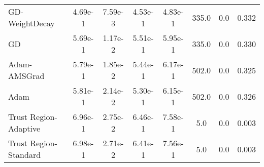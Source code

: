 \documentclass{article}
\begin{document}
\begin{table}[htbp]
{\begin{tabular}{l*{7}{S[table-format=2.2e-1]}}
GD-WeightDecay & 4.69e-1 & 7.59e-3 & 4.53e-1 & 4.83e-1 & 335.0 & 0.0 & 0.332 \\
GD & 5.69e-1 & 1.17e-2 & 5.51e-1 & 5.95e-1 & 335.0 & 0.0 & 0.330 \\
Adam-AMSGrad & 5.79e-1 & 1.85e-2 & 5.44e-1 & 6.17e-1 & 502.0 & 0.0 & 0.325 \\
Adam & 5.81e-1 & 2.14e-2 & 5.30e-1 & 6.15e-1 & 502.0 & 0.0 & 0.326 \\
Trust Region-Adaptive & 6.96e-1 & 2.75e-2 & 6.46e-1 & 7.58e-1 & 5.0 & 0.0 & 0.003 \\
Trust Region-Standard & 6.98e-1 & 2.71e-2 & 6.41e-1 & 7.56e-1 & 5.0 & 0.0 & 0.003 \\
\bottomrule
\end{tabular}
}
\end{table}
\end{document}

